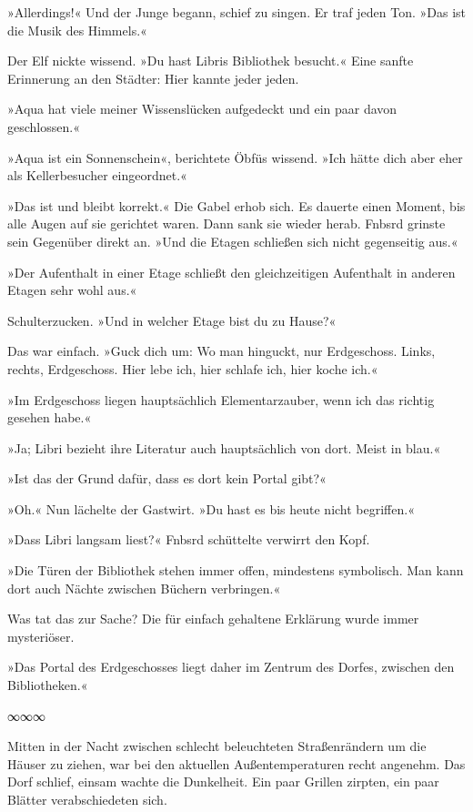 »Allerdings!« Und der Junge begann, schief zu singen. Er traf jeden Ton. »Das ist die Musik des Himmels.«

Der Elf nickte wissend. »Du hast Libris Bibliothek besucht.« Eine sanfte Erinnerung an den Städter: Hier kannte jeder jeden.

»Aqua hat viele meiner Wissenslücken aufgedeckt und ein paar davon geschlossen.«

»Aqua ist ein Sonnenschein«, berichtete Öbfüs wissend. »Ich hätte dich aber eher als Kellerbesucher eingeordnet.«

»Das ist und bleibt korrekt.« Die Gabel erhob sich. Es dauerte einen Moment, bis alle Augen auf sie gerichtet waren. Dann sank sie wieder herab. Fnbsrd grinste sein Gegenüber direkt an. »Und die Etagen schließen sich nicht gegenseitig aus.«

»Der Aufenthalt in einer Etage schließt den gleichzeitigen Aufenthalt in anderen Etagen sehr wohl aus.«

Schulterzucken. »Und in welcher Etage bist du zu Hause?«

Das war einfach. »Guck dich um: Wo man hinguckt, nur Erdgeschoss. Links, rechts, Erdgeschoss. Hier lebe ich, hier schlafe ich, hier koche ich.«

»Im Erdgeschoss liegen hauptsächlich Elementarzauber, wenn ich das richtig gesehen habe.«

»Ja; Libri bezieht ihre Literatur auch hauptsächlich von dort. Meist in blau.«

»Ist das der Grund dafür, dass es dort kein Portal gibt?«

»Oh.« Nun lächelte der Gastwirt. »Du hast es bis heute nicht begriffen.«

»Dass Libri langsam liest?« Fnbsrd schüttelte verwirrt den Kopf.

»Die Türen der Bibliothek stehen immer offen, mindestens symbolisch. Man kann dort auch Nächte zwischen Büchern verbringen.«

Was tat das zur Sache? Die für einfach gehaltene Erklärung wurde immer mysteriöser.

»Das Portal des Erdgeschosses liegt daher im Zentrum des Dorfes, zwischen den Bibliotheken.«

\begin{center}
∞∞∞
\end{center}

Mitten in der Nacht zwischen schlecht beleuchteten Straßenrändern um die Häuser zu ziehen, war bei den aktuellen Außentemperaturen recht angenehm. Das Dorf schlief, einsam wachte die Dunkelheit. Ein paar Grillen zirpten, ein paar Blätter verabschiedeten sich.

